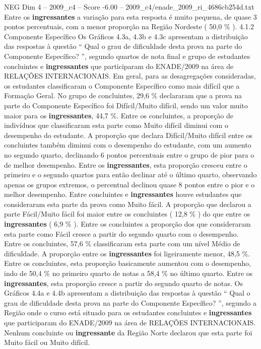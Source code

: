 \begin{textsample}{NEG Dim 4 – 2009\_c4 – Score -6.00 – 2009\_c4/enade\_2009\_ri\_4686cb254d.txt}
Entre os \textbf{ingressantes} a variação para esta resposta é muito pequena, de quase 3 pontos percentuais, com a menor proporção na Região Nordeste ( 50,0 \% ). 4.1.2 Componente Específico Os Gráficos 4.3a, 4.3b e 4.3c apresentam a distribuição das respostas à questão “ Qual o grau de dificuldade desta prova na parte do Componente Específico? ”, segundo quartos de nota final e grupo de estudantes concluintes e \textbf{ingressantes} que participaram do ENADE/2009 na área de RELAÇÕES INTERNACIONAIS.
Em geral, para as desagregações consideradas, os estudantes classificaram o Componente Específico como mais difícil que a Formação Geral.
No grupo de concluintes, 29,6 \% declararam que a prova na parte do Componente Específico foi Difícil/Muito difícil, sendo um valor muito maior para os \textbf{ingressantes}, 44,7 \%.
Entre os concluintes, a proporção de indivíduos que classificaram esta parte como Muito difícil diminui com o desempenho do estudante.
A proporção que declara Difícil/Muito difícil entre os concluintes também diminui com o desempenho do estudante, com um aumento no segundo quarto, declinando 6 pontos percentuais entre o grupo de pior para o de melhor desempenho.
Entre os \textbf{ingressantes}, esta proporção cresceu entre o primeiro e o segundo quartos para então declinar até o último quarto, observando apenas os grupos extremos, o percentual declinou quase 8 pontos entre o pior e o melhor desempenho.
Entre concluintes e \textbf{ingressantes} houve estudantes que consideraram esta parte da prova como Muito fácil.
A proporção que declarou a parte Fácil/Muito fácil foi maior entre os concluintes ( 12,8 \% ) do que entre os \textbf{ingressantes} ( 6,9 \% ).
Entre os concluintes a proporção dos que consideraram esta parte como Fácil cresce a partir do segundo quarto com o desempenho.
Entre os concluintes, 57,6 \% classificaram esta parte com um nível Médio de dificuldade.
A proporção entre os \textbf{ingressantes} foi ligeiramente menor, 48,5 \%.
Entre os concluintes, esta proporção basicamente aumentou com o desempenho, indo de 50,4 \% no primeiro quarto de notas a 58,4 \% no último quarto.
Entre os \textbf{ingressantes}, esta proporção cresce a partir do segundo quarto de notas.
Os Gráficos 4.4a e 4.4b apresentam a distribuição das respostas à questão “ Qual o grau de dificuldade desta prova na parte do Componente Específico? ”, segundo a Região onde o curso está situado para os estudantes concluintes e \textbf{ingressantes} que participaram do ENADE/2009 na área de RELAÇÕES INTERNACIONAIS.
Nenhum concluinte ou \textbf{ingressante} da Região Norte declarou que esta parte foi Muito fácil ou Muito difícil.

\end{textsample}
